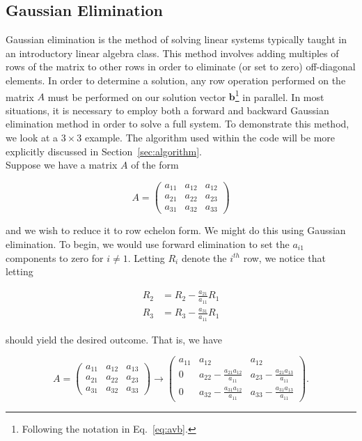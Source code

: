 \documentclass[12pt]{article}
\numberwithin{equation}{section}
\begin{document}
\subsection{Gaussian Elimination}
\label{subsec:gausselim}

Gaussian elimination is the method of solving linear systems typically taught in an introductory linear algebra class. This method involves adding multiples of rows of the matrix to other rows in order to eliminate (or set to zero) off-diagonal elements.  In order to determine a solution, any row operation performed on the matrix $A$ must be performed on our solution vector $\textbf{b}$\footnote{Following the notation in Eq.~\ref{eq:avb}.} in parallel.  In most situations, it is necessary to employ both a forward and backward Gaussian elimination method in order to solve a full system.  To demonstrate this method, we look at a $3\times 3$ example.  The algorithm used within the code will be more explicitly discussed in Section~\ref{sec:algorithm}.
\\\indent Suppose we have a matrix $A$ of the form

\begin{equation}
\label{eq:ainit}
A = \left(
\begin{array}{ccc}
a_{11} & a_{12} & a_{12} \\
a_{21} & a_{22} & a_{23} \\
a_{31} & a_{32} & a_{33}
\end{array}
\right)
\end{equation}

\noindent and we wish to reduce it to row echelon form.  We might do this using Gaussian elimination.  To begin, we would use forward elimination to set the $a_{i1}$ components to zero for $i\neq1$.  Letting $R_{i}$ denote the $i^{th}$ row, we notice that letting 

\begin{equation}
\label{eq:rowops1}
\begin{align}
R_{2} & = R_{2} - \frac{a_{21}}{a_{11}}R_{1} \\
R_{3} & = R_{3} - \frac{a_{31}}{a_{11}}R_{1}
\end{align}
\end{equation}

\noindent should yield the desired outcome.  That is, we have 

\begin{equation}
\label{eq:gaussflops}
A = \left(
\begin{array}{ccc}
a_{11} & a_{12} & a_{13} \\
a_{21} & a_{22} & a_{23} \\
a_{31} & a_{32} & a_{33}
\end{array}
\right) \rightarrow \left(
\begin{array}{ccc}
a_{11} & a_{12} & a_{12} \\
0 & a_{22} - \frac{a_{21}a_{12}}{a_{11}} & a_{23} - \frac{a_{21}a_{13}}{a_{11}} \\
0 & a_{32} - \frac{a_{31}a_{12}}{a_{11}} & a_{33} - \frac{a_{31}a_{13}}{a_{11}}
\end{array}\right).
\end{equation}
\end{document}
